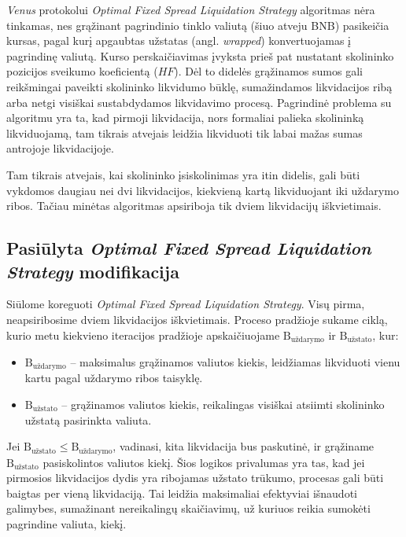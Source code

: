\documentclass[]{VUMIFTemplateClass}
\begin{document}
\textit{Venus} protokolui \textit{Optimal Fixed Spread Liquidation Strategy} algoritmas nėra tinkamas, nes grąžinant pagrindinio tinklo valiutą (šiuo atveju BNB) pasikeičia kursas, pagal kurį apgaubtas užstatas (angl. \textit{wrapped}) konvertuojamas į pagrindinę valiutą. Kurso perskaičiavimas įvyksta prieš pat nustatant skolininko pozicijos sveikumo koeficientą ($HF$). Dėl to didelės grąžinamos sumos gali reikšmingai paveikti skolininko likvidumo būklę, sumažindamos likvidacijos ribą arba netgi visiškai sustabdydamos likvidavimo procesą. Pagrindinė problema su algoritmu yra ta, kad pirmoji likvidacija, nors formaliai palieka skolininką likviduojamą, tam tikrais atvejais leidžia likviduoti tik labai mažas sumas antrojoje likvidacijoje.

Tam tikrais atvejais, kai skolininko įsiskolinimas yra itin didelis, gali būti vykdomos daugiau nei dvi likvidacijos, kiekvieną kartą likviduojant iki uždarymo ribos. Tačiau minėtas algoritmas apsiriboja tik dviem likvidacijų iškvietimais.

\subsection{Pasiūlyta \textit{Optimal Fixed Spread Liquidation Strategy} modifikacija}

Siūlome koreguoti \textit{Optimal Fixed Spread Liquidation Strategy}. Visų pirma, neapsiribosime dviem likvidacijos iškvietimais. Proceso pradžioje sukame ciklą, kurio metu kiekvieno iteracijos pradžioje apskaičiuojame $\text{B}_{\text{uždarymo}}$ ir $\text{B}_{\text{užstato}}$, kur:

\begin{itemize}
\item $\text{B}_{\text{uždarymo}}$ – maksimalus grąžinamos valiutos kiekis, leidžiamas likviduoti vienu kartu pagal uždarymo ribos taisyklę.
\item $\text{B}_{\text{užstato}}$ – grąžinamos valiutos kiekis, reikalingas visiškai atsiimti skolininko užstatą pasirinkta valiuta.
\end{itemize}

Jei $\text{B}_{\text{užstato}} \leq \text{B}_{\text{uždarymo}}$, vadinasi, kita likvidacija bus paskutinė, ir grąžiname $\text{B}_{\text{užstato}}$ pasiskolintos valiutos kiekį. Šios logikos privalumas yra tas, kad jei pirmosios likvidacijos dydis yra ribojamas užstato trūkumo, procesas gali būti baigtas per vieną likvidaciją. Tai leidžia maksimaliai efektyviai išnaudoti galimybes, sumažinant nereikalingų skaičiavimų, už kuriuos reikia sumokėti pagrindine valiuta, kiekį.
\end{document}
